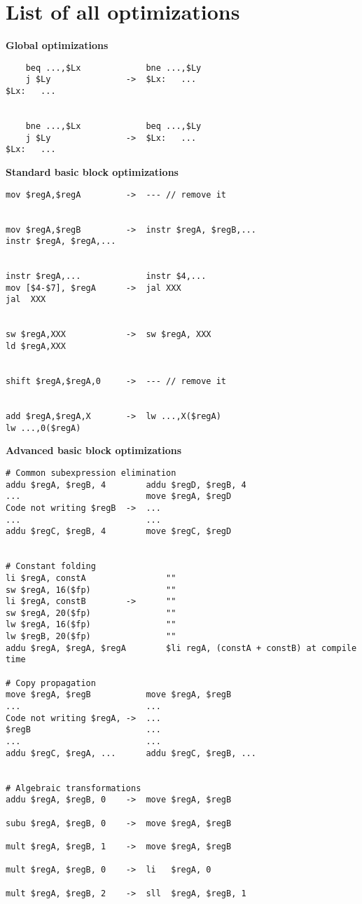 \documentclass[10pt,a4paper]{article}
\begin{document}
\pagebreak
\appendix

\section{List of all optimizations}

\label{opt}

\textbf{Global optimizations}

\begin{verbatim}
    beq ...,$Lx             bne ...,$Ly
    j $Ly               ->  $Lx:   ...
$Lx:   ...


    bne ...,$Lx             beq ...,$Ly
    j $Ly               ->  $Lx:   ...
$Lx:   ...
\end{verbatim}
\textbf{Standard basic block optimizations}

\begin{verbatim}
mov $regA,$regA         ->  --- // remove it


mov $regA,$regB         ->  instr $regA, $regB,...
instr $regA, $regA,...


instr $regA,...             instr $4,...
mov [$4-$7], $regA      ->  jal XXX
jal  XXX


sw $regA,XXX            ->  sw $regA, XXX
ld $regA,XXX


shift $regA,$regA,0     ->  --- // remove it


add $regA,$regA,X       ->  lw ...,X($regA)
lw ...,0($regA)
\end{verbatim}
\textbf{Advanced basic block optimizations}

\begin{verbatim}
# Common subexpression elimination
addu $regA, $regB, 4        addu $regD, $regB, 4
...                         move $regA, $regD
Code not writing $regB  ->  ...
...                         ...
addu $regC, $regB, 4        move $regC, $regD


# Constant folding
li $regA, constA                ""       
sw $regA, 16($fp)               ""
li $regA, constB        ->      ""
sw $regA, 20($fp)               ""	
lw $regA, 16($fp)               "" 
lw $regB, 20($fp)               ""
addu $regA, $regA, $regA        $li regA, (constA + constB) at compile time

# Copy propagation
move $regA, $regB           move $regA, $regB
...                         ...
Code not writing $regA, ->  ...
$regB                       ...
...                         ...
addu $regC, $regA, ...      addu $regC, $regB, ...


# Algebraic transformations
addu $regA, $regB, 0    ->  move $regA, $regB

subu $regA, $regB, 0    ->  move $regA, $regB

mult $regA, $regB, 1    ->  move $regA, $regB

mult $regA, $regB, 0    ->  li   $regA, 0

mult $regA, $regB, 2    ->  sll  $regA, $regB, 1
\end{verbatim}
\end{document}

